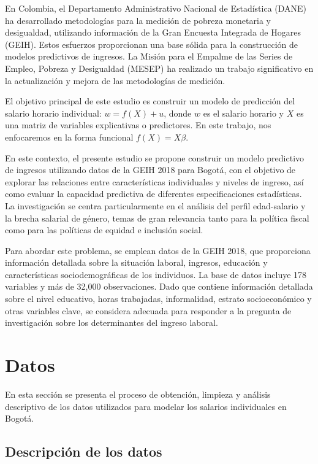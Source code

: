 \documentclass[12pt,a4paper,onecolumn]{article}
\begin{document}
En Colombia, el Departamento Administrativo Nacional de Estadística (DANE) ha desarrollado metodologías para la medición de pobreza monetaria y desigualdad, utilizando información de la Gran Encuesta Integrada de Hogares (GEIH). Estos esfuerzos proporcionan una base sólida para la construcción de modelos predictivos de ingresos. La Misión para el Empalme de las Series de Empleo, Pobreza y Desigualdad (MESEP) ha realizado un trabajo significativo en la actualización y mejora de las metodologías de medición.

El objetivo principal de este estudio es construir un modelo de predicción del salario horario individual: $w = f(X) + u$, donde $w$ es el salario horario y $X$ es una matriz de variables explicativas o predictores. En este trabajo, nos enfocaremos en la forma funcional $f(X) = X\beta$.

En este contexto, el presente estudio se propone construir un modelo predictivo de ingresos utilizando datos de la GEIH 2018 para Bogotá, con el objetivo de explorar las relaciones entre características individuales y niveles de ingreso, así como evaluar la capacidad predictiva de diferentes especificaciones estadísticas. La investigación se centra particularmente en el análisis del perfil edad-salario y la brecha salarial de género, temas de gran relevancia tanto para la política fiscal como para las políticas de equidad e inclusión social.

Para abordar este problema, se emplean datos de la GEIH 2018, que proporciona información detallada sobre la situación laboral, ingresos, educación y características sociodemográficas de los individuos. La base de datos incluye 178 variables y más de 32,000 observaciones. Dado que contiene información detallada sobre el nivel educativo, horas trabajadas, informalidad, estrato socioeconómico y otras variables clave, se considera adecuada para responder a la pregunta de investigación sobre los determinantes del ingreso laboral.

\section{Datos}
En esta sección se presenta el proceso de obtención, limpieza y análisis descriptivo de los datos utilizados para modelar los salarios individuales en Bogotá.

\subsection{Descripción de los datos}
\end{document}

